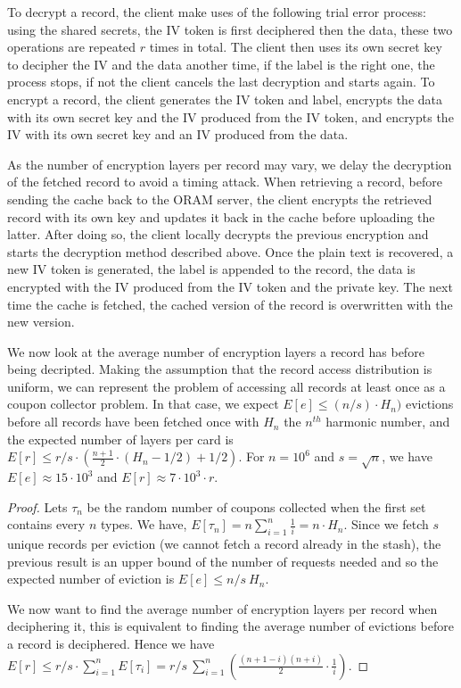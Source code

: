 \documentclass[USenglish,oneside,twocolumn]{article}
\begin{document}
To decrypt a record, the client make uses of the following trial error process: using the shared secrets, the IV token is first deciphered then the data, these two operations are repeated $r$ times in total. The client then uses its own secret key to decipher the IV and the data another time, if the label is the right one, the process stops, if not the client cancels the last decryption and starts again.
To encrypt a record, the client generates the IV token and label, encrypts the data with its own secret key and the IV produced from the IV token, and encrypts the IV with its own secret key and an IV produced from the data.
 
As the number of encryption layers per record may vary, we delay the decryption of the fetched record to avoid a timing attack. When retrieving a record, before sending the cache back to the ORAM server, the client encrypts the retrieved record with its own key and updates it back in the cache before uploading the latter.
After doing so, the client locally decrypts the previous encryption and starts the decryption method described above. Once the plain text is recovered, a new IV token is generated, the label is appended to the record, the data is encrypted with the IV produced from the IV token and the private key. The next time the cache is fetched, the cached version of the record is overwritten with the new version. 

We now look at the average number of encryption layers a record has before being decripted. Making the assumption that the record access distribution is uniform, we can represent the problem of accessing all records at least once as a coupon collector problem. In that case, we expect $E[e]\leq(n/s)\cdot H_n )$ evictions before all records have been fetched once with $H_n$ the $n^{th}$ harmonic number, and the expected number of layers per card is $E[r]\leq{r/s} \cdot \left ( \frac{n+1}{2}\cdot(H_n-1/2)+1/2 \right )$. For $n=10^6$ and $s=\sqrt{n}$, we have $E[e]\approx 15 \cdot 10^3$ and $E[r]\approx 7\cdot 10^3 \cdot r$.
\begin{proof}
Lets $\tau_n$ be the random number of coupons collected when the first set contains every $n$ types. We have, $E[\tau_n]=n\sum_{i=1}^n \frac{1}{i} = n \cdot H_n$.
Since we fetch $s$ unique records per eviction (we cannot fetch a record already in the stash), the previous result is an upper bound of the number of requests needed and so the expected number of eviction is $E[e]\leq n/s\ H_n$.

We now want to find the average number of encryption layers per record when deciphering it, this is equivalent to finding the average number of evictions before a record is deciphered. 
Hence we have $E[r]\leq r/s \cdot \sum_{i=1}^n E[\tau_i] = r/s\ \sum_{i=1}^n \left (\frac{(n+1-i)(n+i)}{2}\cdot \frac{1}{i}\right )$. 
\end{proof}
\end{document}
